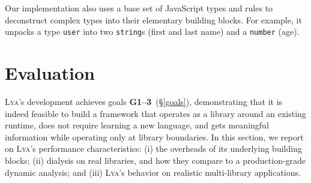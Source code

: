 \documentclass[letterpaper,twocolumn,10pt]{article}
\newcommand{\ttt}[1]{\texttt{#1}}
\newcommand{\sx}[1]{(\S\ref{#1})}
\newcommand{\sys}{{\scshape Lya}\xspace}
\begin{document}
Our implementation also uses a base set of JavaScript types and rules to deconstruct complex types into their elementary building blocks.
For example, it unpacks a type \ttt{user} into two \ttt{string}s (first and last name) and a \ttt{number} (age).


% 

\section{Evaluation}
\label{eval}

\sys's  development achieves goals \textbf{G1--3}~\sx{goals}, demonstrating that it is indeed feasible to build a framework that 
  operates as a library around an existing runtime,
  does not require learning a new language, and 
  gets meaningful information while operating only at library boundaries.
In this section, we report on \sys's performance characteristics:
  (i) the overheads of its underlying building blocks;
  (ii) dialysis on real libraries, and how they compare to a production-grade dynamic analysis; and
  (iii) \sys's behavior on realistic  multi-library applications.
\end{document}
